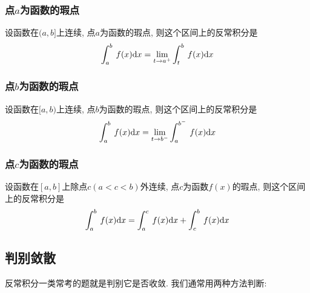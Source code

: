 \subsubsection{点$ a $为函数的瑕点}
设函数在$ (a,b] $上连续, 点$ a $为函数的瑕点, 则这个区间上的反常积分是
\begin{equation*}
\displaystyle\int_{a}^{b}\hspace{.2em}f(x)\mathrm{d}x=\lim\limits_{t \rightarrow a^{+}}\displaystyle\int_{t}^{b}\hspace{.2em}f(x)\mathrm{d}x
\end{equation*}
\subsubsection{点$ b $为函数的瑕点}
设函数在$ [a,b) $上连续, 点$ b $为函数的瑕点, 则这个区间上的反常积分是
\begin{equation*}
\displaystyle\int_{a}^{b}\hspace{.2em}f(x)\mathrm{d}x=\lim\limits_{t \rightarrow b^{-}}\displaystyle\int_{a}^{b^{-}}\hspace{.2em}f(x)\mathrm{d}x
\end{equation*}
\subsubsection{点$ c $为函数的瑕点}
设函数在$ [a,b] $上除点$ c(a<c<b) $外连续, 点$ c $为函数$ f(x) $的瑕点, 则这个区间上的反常积分是
\begin{equation*}
\displaystyle\int_{a}^{b}\hspace{.2em}f(x)\mathrm{d}x=\displaystyle\int_{a}^{c}\hspace{.2em}f(x)\mathrm{d}x+\displaystyle\int_{c}^{b}\hspace{.2em}f(x)\mathrm{d}x
\end{equation*}
\subsection{判别敛散}
反常积分一类常考的题就是判别它是否收敛. 我们通常用两种方法判断:
